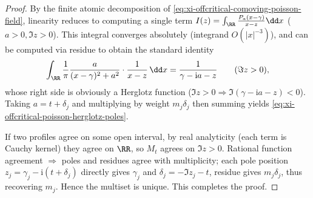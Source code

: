 \begin{proof}
By the finite atomic decomposition of \eqref{eq:xi-offcritical-comoving-poisson-field}, linearity reduces to computing a single term
\(
I(z)=\int_{\RR}\frac{P_a(x-\gamma)}{x-z}\dd x
\)
(\(a>0,\Im z>0\)).
This integral converges absolutely (integrand \(O(|x|^{-3})\)), and can be computed via residue to obtain the standard identity
\[
\int_{\RR}\frac{1}{\pi}\frac{a}{(x-\gamma)^2+a^2}\cdot \frac{1}{x-z}\,\dd x
=\frac{1}{\gamma-\mathrm{i}a-z}\qquad(\Im z>0),
\]
whose right side is obviously a Herglotz function (\(\Im z>0\Rightarrow \Im(\gamma-\mathrm{i}a-z)<0\)).
Taking \(a=t+\delta_j\) and multiplying by weight \(m_j\delta_j\) then summing yields \eqref{eq:xi-offcritical-poisson-herglotz-poles}.
\par
If two profiles agree on some open interval, by real analyticity (each term is Cauchy kernel) they agree on \(\RR\), so \(M_t\) agrees on \(\Im z>0\).
Rational function agreement \(\Rightarrow\) poles and residues agree with multiplicity; each pole position \(z_j=\gamma_j-\mathrm{i}(t+\delta_j)\) directly gives \(\gamma_j\) and \(\delta_j=-\Im z_j-t\), residue gives \(m_j\delta_j\), thus recovering \(m_j\).
Hence the multiset is unique. This completes the proof.
\end{proof}

